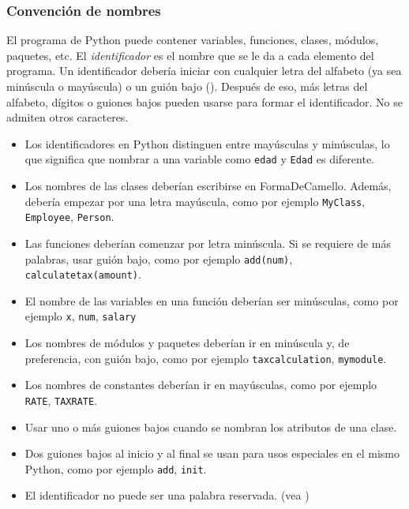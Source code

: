     \subsubsection{Convención de nombres}\label{subsubsec: conv_nom}
    El programa de Python puede contener variables, funciones, clases, módulos, paquetes, etc. El \emph{identificador} es el nombre que se le da a cada elemento del programa. Un identificador debería iniciar con cualquier letra del alfabeto (ya sea minúscula o mayúscula) o un guión bajo (\textunderscore). Después de eso, más letras del alfabeto, dígitos o guiones bajos pueden usarse para formar el identificador. No se admiten otros caracteres.
    \begin{itemize}
        \item Los identificadores en Python distinguen entre mayúsculas y minúsculas, lo que significa que nombrar a una variable como \texttt{edad} y \texttt{Edad} es diferente.
        \item Los nombres de las clases deberían escribirse en FormaDeCamello. Además, debería empezar por una letra mayúscula, como por ejemplo \texttt{MyClass}, \texttt{Employee}, \texttt{Person}.
        \item Las funciones deberían comenzar por letra minúscula. Si se requiere de más palabras, usar guión bajo, como por ejemplo \texttt{add(num)}, \texttt{calculate\textunderscore tax(amount)}.
        \item El nombre de las variables en una función deberían ser minúsculas, como por ejemplo \texttt{x}, \texttt{num}, \texttt{salary}
        \item Los nombres de módulos y paquetes deberían ir en minúscula y, de preferencia, con guión bajo, como por ejemplo \texttt{tax\textunderscore calculation}, \texttt{mymodule}.
        \item Los nombres de constantes deberían ir en mayúsculas, como por ejemplo \texttt{RATE}, \texttt{TAX\textunderscore RATE}.
        \item Usar uno o más guiones bajos cuando se nombran los atributos de una clase.
        \item Dos guiones bajos al inicio y al final se usan para usos especiales en el mismo Python, como por ejemplo \texttt{\textunderscore\textunderscore add\textunderscore\textunderscore}, \texttt{\textunderscore\textunderscore init\textunderscore\textunderscore}.
        \item El identificador no puede ser una palabra reservada. (vea )
    \end{itemize}
